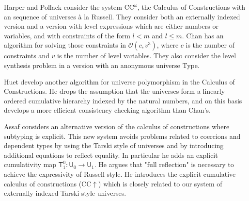 \documentclass[11pt,a4paper]{article}
\def\UU{\mathsf{U}}
\newcommand{\T}{\mathsf{T}}
\def\Ordo{\mathcal{O}}
\def\CComega{\mathrm{CC}^\omega}
\begin{document}
Harper and Pollack \cite{HarperP91} consider the system $\CComega$, the Calculus of Constructions with an sequence of universes \`a la Russell. They consider both an externally indexed version and a version with level expressions which are either numbers or variables, and with constraints of the form $l < m$ and $l \leq m$. Chan has an algorithm for solving those constraints in $\Ordo(c,v^3)$, where $c$ is the number of constraints and $v$ is the number of level variables. They also consider the level synthesis problem in a version with an anonymous universe Type.

Huet \cite{Huet87} develop another algorithm for universe polymorphism in the Calculus of Constructions. He drops the assumption that the universes form a linearly-ordered cumulative hierarchy indexed by the natural numbers, and on this basis develops a more efficient consistency checking algorithm than Chan's.

Assaf \cite{Assaf14} considers an alternative version of the calculus of
constructions where subtyping is explicit. This new system avoids problems related to coercions and dependent types by using the Tarski style
of universes and by introducing additional equations to reflect equality. In particular he adds an explicit cumulativity map $\T^0_1 : \UU_0 \to \UU_1$. He argues that "full reflection" is necessary to achieve the expressivity of Russell style. He introduces the explicit cumulative calculus of constructions (CC$\uparrow$) which is closely related to our system of externally indexed Tarski style universes.



\end{document}
